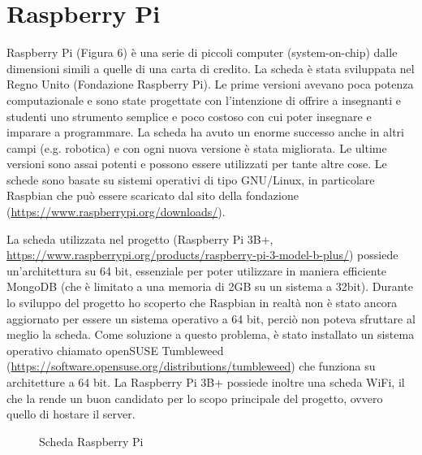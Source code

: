 \documentclass[12pt]{report}
\begin{document}
%

\section{Raspberry Pi}
%

Raspberry Pi (Figura 6) è una serie di piccoli computer (system-on-chip) dalle dimensioni simili a quelle di una carta di credito. La scheda è stata sviluppata nel Regno Unito (Fondazione Raspberry Pi). Le prime versioni avevano poca potenza computazionale e sono state progettate con l'intenzione di offrire a insegnanti e studenti uno strumento semplice e poco costoso con cui poter insegnare e imparare a programmare. La scheda ha avuto un enorme successo anche in altri campi (e.g. robotica) e con ogni nuova versione è stata migliorata. Le ultime versioni sono assai potenti e possono essere utilizzati per tante altre cose. Le schede sono basate su sistemi operativi di tipo GNU/Linux, in particolare Raspbian che può essere scaricato dal sito della fondazione (\url{https://www.raspberrypi.org/downloads/}). 

La scheda utilizzata nel progetto (Raspberry Pi 3B+, \url{https://www.raspberrypi.org/products/raspberry-pi-3-model-b-plus/}) possiede un'architettura su 64 bit, essenziale per poter utilizzare in maniera efficiente MongoDB (che è limitato a una memoria di 2GB su un sistema a 32bit). Durante lo sviluppo del progetto ho scoperto che Raspbian in realtà non è stato ancora aggiornato per essere un sistema operativo a 64 bit, perciò non poteva sfruttare al meglio la scheda. Come soluzione a questo problema, è stato installato un sistema operativo chiamato openSUSE Tumbleweed (\url{https://software.opensuse.org/distributions/tumbleweed}) che funziona su architetture a 64 bit. 
La Raspberry Pi 3B+ possiede inoltre una scheda WiFi, il che la rende un buon candidato per lo scopo principale del progetto, ovvero quello di hostare il server.

\begin{figure}
	\caption{Scheda Raspberry Pi}
	\label{fig:usecase}
\end{figure}
\end{document}
